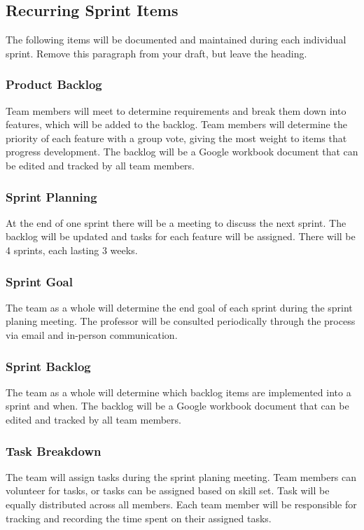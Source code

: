 \subsection{Recurring Sprint Items}
The following items will be documented and maintained during each individual sprint. Remove this paragraph from your draft, but leave the heading.

\subsubsection{Product Backlog}
Team members will meet to determine requirements and break them down into features, which will be added to the backlog. Team members will determine the priority of each feature with a group vote, giving the most weight to items that progress development. The backlog will be a Google workbook document that can be edited and tracked by all team members.

\subsubsection{Sprint Planning}
At the end of one sprint there will be a meeting to discuss the next sprint. The backlog will be updated and tasks for each feature will be assigned. There will be 4 sprints, each lasting 3 weeks.

\subsubsection{Sprint Goal}
The team as a whole will determine the end goal of each sprint during the sprint planing meeting. The professor will be consulted periodically through the process via email and in-person communication. 

\subsubsection{Sprint Backlog}
The team as a whole will determine which backlog items are implemented into a sprint and when. The backlog will be a Google workbook document that can be edited and tracked by all team members.

\subsubsection{Task Breakdown}
The team will assign tasks during the sprint planing meeting. Team members can volunteer for tasks, or tasks can be assigned based on skill set. Task will be equally distributed across all members. Each team member will be responsible for tracking and recording the time spent on their assigned tasks. 


